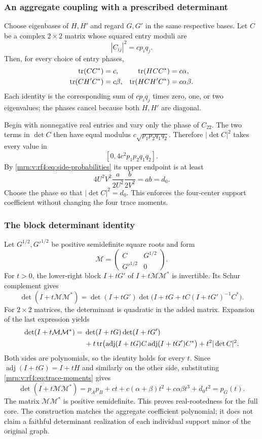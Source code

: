 \documentclass[11pt,a4paper]{article}
\theoremstyle{remark}\newtheorem{remark}[theorem]{Remark}
\newcommand{\adj}{\operatorname{adj}}      %
\newcommand{\tr}{\operatorname{tr}}        %
\begin{document}
\subsubsection{An aggregate coupling with a prescribed determinant}
Choose eigenbases of $H,H'$ and regard $G,G'$ in the same respective bases. Let $C$ be a complex $2\times2$ matrix whose squared entry moduli are
\[
|C_{ij}|^2=cp_iq_j.
\]
Then, for every choice of entry phases,
\begin{align}\label{mrn:v:rf4:eq:trace-moments}
\tr(CC^*)&=c,&\tr(HCC^*)&=c\alpha,\\
\tr(CH'C^*)&=c\beta,&\tr(HCH'C^*)&=c\alpha\beta.\notag
\end{align}
Each identity is the corresponding sum of $cp_iq_j$ times zero, one, or two eigenvalues; the phases cancel because both $H,H'$ are diagonal.

Begin with nonnegative real entries and vary only the phase of $C_{22}$. The two terms in $\det C$ then have equal modulus
$c\sqrt{p_1p_2q_1q_2}$. Therefore $|\det C|^2$ takes every value in
\[
[0,4c^2p_1p_2q_1q_2].
\]
By \eqref{mrn:v:rf4:eq:side-probabilities} its upper endpoint is at least
\[
4U^2V^2\frac a{2U^2}\frac b{2V^2}=ab=d_0.
\]
Choose the phase so that $|\det C|^2=d_0$. This enforces the four-center support coefficient without changing the four trace moments.

\subsubsection{The block determinant identity}
Let $G^{1/2},G'^{1/2}$ be positive semidefinite square roots and form
\[
\mathcal M=\begin{pmatrix}C&G^{1/2}\\G'^{1/2}&0\end{pmatrix}.
\]
For $t>0$, the lower-right block $I+tG'$ of $I+t\mathcal M\mathcal M^*$ is invertible. Its Schur complement gives
\[
\det(I+t\mathcal M\mathcal M^*)
=\det(I+tG')\det\bigl(I+tG+tC(I+tG')^{-1}C^*\bigr).
\]
For $2\times2$ matrices, the determinant is quadratic in the added matrix. Expansion of the last expression yields
\begin{align}\label{mrn:v:rf4:eq:block-determinant}
\det(I+t\mathcal M\mathcal M^*)={}&\det(I+tG)\det(I+tG')\notag\\
&+t\tr\bigl(\adj(I+tG)C\adj(I+tG')C^*\bigr)
+t^2|\det C|^2.
\end{align}
Both sides are polynomials, so the identity holds for every $t$. Since
$\adj(I+tG)=I+tH$ and similarly on the other side, substituting \eqref{mrn:v:rf4:eq:trace-moments} gives
\[
\det(I+t\mathcal M\mathcal M^*)
=p_Ap_B+ct+c(\alpha+\beta)t^2+c\alpha\beta t^3+d_0t^2=p_G(t).
\]
The matrix $\mathcal M\mathcal M^*$ is positive semidefinite. This proves real-rootedness for the full core. The construction matches the aggregate coefficient polynomial; it does not claim a faithful determinant realization of each individual support minor of the original graph.
\end{document}
